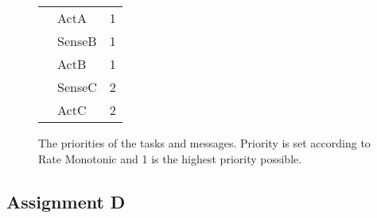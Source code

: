 \begin{figure}[H]
\begin{minipage}{0.5\textwidth}
\begin{table}[H]
\begin{tabular}{|l|l|l|}
                                        & ActA      & 1 \\ 
                                        & SenseB    & 1 \\
                                        & ActB      & 1 \\
                                        & SenseC    & 2 \\
                                        & ActC      & 2 \\ \hline
            \end{tabular}
        \end{table}
    \end{minipage}
    \caption{The priorities of the tasks and messages. Priority is set according to Rate Monotonic and 1 is the highest priority possible.}
    \label{fig:priority}
    \end{figure}
    \renewcommand{\arraystretch}{1.0}

    \subsection{Assignment D}


